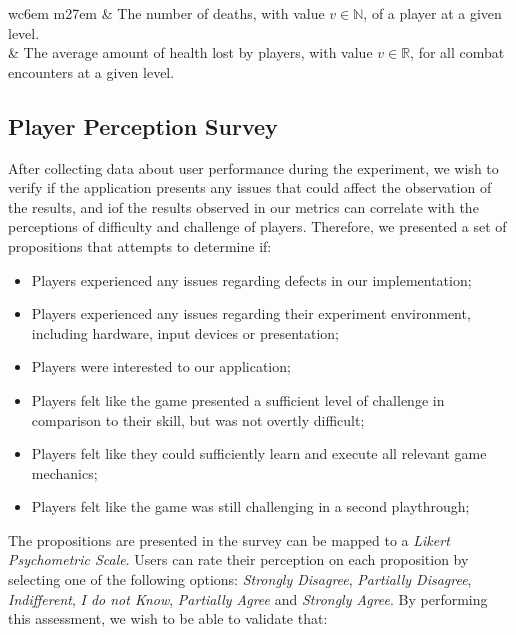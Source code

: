 \begin{table}[!ht]
\begin{center}
\begin{tabular}{ w{c}{6em} m{27em} }
         & The number of deaths, with value $v \in \mathbb{N}$, of a player at a given level. \\
         & The average amount of health lost by players, with value $v \in \mathbb{R}$, for all combat encounters at a given level.  \\
        \bottomrule
      \end{tabular}
    \end{center}
\end{table}

\subsection{Player Perception Survey}


After collecting data about user performance during the experiment, we wish to verify if the application presents any issues that could affect the observation of the results, and iof the results observed in our metrics can correlate with the perceptions of difficulty and challenge of players. Therefore, we presented a set of propositions that attempts to determine if:

\begin{itemize}
    \item{Players experienced any issues regarding defects in our implementation;}
    \item{Players experienced any issues regarding their experiment environment, including hardware, input devices or presentation;}
    \item{Players were interested to our application;}
    \item{Players felt like the game presented a sufficient level of challenge in comparison to their skill, but was not overtly difficult;}
    \item{Players felt like they could sufficiently learn and execute all relevant game mechanics;}
    \item{Players felt like the game was still challenging in a second playthrough;}
\end{itemize}

The propositions are presented in the survey can be mapped to a \emph{Likert Psychometric Scale}. Users can rate their perception on each proposition by selecting one of the following options: \emph{Strongly Disagree}, \emph{Partially Disagree}, \emph{Indifferent}, \emph{I do not Know}, \emph{Partially Agree} and \emph{Strongly Agree}. By performing this assessment, we wish to be able to validate that:

